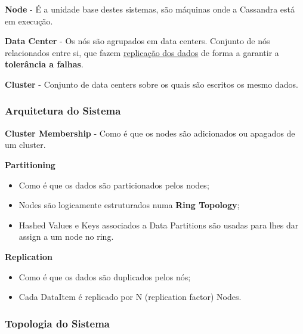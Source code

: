 \documentclass{article}
\begin{document}
\begin{flushleft}
  \textbf{Node} - É a unidade base destes sistemas, são máquinas
  onde a Cassandra está em execução.

  \vspace{2mm}

  \textbf{Data Center} - Os nós são agrupados em data centers.
  Conjunto de nós relacionados entre si, que fazem \uline{replicação dos dados}
  de forma a garantir a \textbf{tolerância a falhas}.

  \vspace{2mm}

  \textbf{Cluster} - Conjunto de data centers sobre os quais são escritos
  os mesmo dados.
\end{flushleft}

\pagebreak

\subsubsection{Arquitetura do Sistema}

\begin{flushleft}
  \textbf{Cluster Membership} - Como é que os nodes são adicionados ou
  apagados de um cluster.

  \vspace{2mm}

  \textbf{Partitioning}
  \begin{itemize}
    \item Como é que os dados são particionados pelos nodes;
    \item Nodes são logicamente estruturados numa \textbf{Ring Topology};
    \item Hashed Values e Keys associados a Data Partitions são usadas para
    lhes dar assign a um node no ring.
  \end{itemize}

  \vspace{2mm}

  \textbf{Replication}
  \begin{itemize}
    \item Como é que os dados são duplicados pelos nós;
    \item Cada DataItem é replicado por N (replication factor) Nodes.
  \end{itemize}
\end{flushleft}

\subsubsection{Topologia do Sistema}
\end{document}
